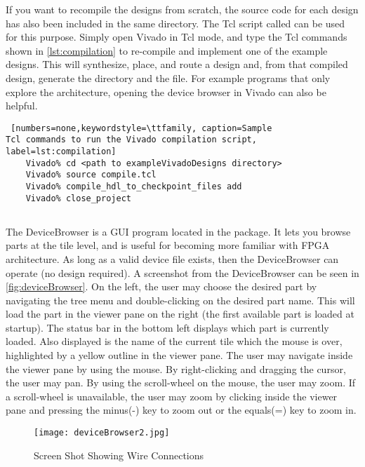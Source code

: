 If you want to recompile the designs from scratch, the source code for each
design has also been included in the same directory. The Tcl script called
 can be used for this purpose. Simply open Vivado in Tcl
mode, and type the Tcl commands shown in \autoref{lst:compilation} to re-compile
and implement one of the example designs. This will synthesize, place, and
route a design and, from that compiled design, generate the 
directory and the  file. For example programs that only explore the
architecture, opening the device browser in Vivado can also be helpful.
                 
\begin{lstlisting} [numbers=none,keywordstyle=\ttfamily, caption=Sample
Tcl commands to run the Vivado compilation script, label=lst:compilation] 
	Vivado% cd <path to exampleVivadoDesigns directory>
	Vivado% source compile.tcl
	Vivado% compile_hdl_to_checkpoint_files add
	Vivado% close_project
\end{lstlisting}

\subsection{}
The DeviceBrowser is a GUI program located in the 
 package. It lets you browse
parts at the tile level, and is useful for becoming more familiar with FPGA
architecture. As long as a valid device file exists, then the DeviceBrowser can
operate (no design required). A screenshot from the DeviceBrowser can be seen in
\autoref{fig:deviceBrowser}. On the left, the user may choose the desired part
by navigating the tree menu and double-clicking on the desired part name.
This will load the part in the viewer pane on the right (the first available
part is loaded at startup). The status bar in the bottom left displays which
part is currently loaded. Also displayed is the name of the current tile
which the mouse is over, highlighted by a yellow outline in the viewer pane.
The user may navigate inside the viewer pane by using the mouse. By
right-clicking and dragging the cursor, the user may pan. By using the
scroll-wheel on the mouse, the user may zoom. If a scroll-wheel is
unavailable, the user may zoom by clicking inside the viewer pane and pressing
the minus(-) key to zoom out or the equals(=) key to zoom in.

\begin{figure}[htb]
\centering
\texttt{[image: deviceBrowser2.jpg]}
\caption{ Screen Shot Showing Wire Connections}
\label{fig:deviceBrowser2}
\end{figure}

